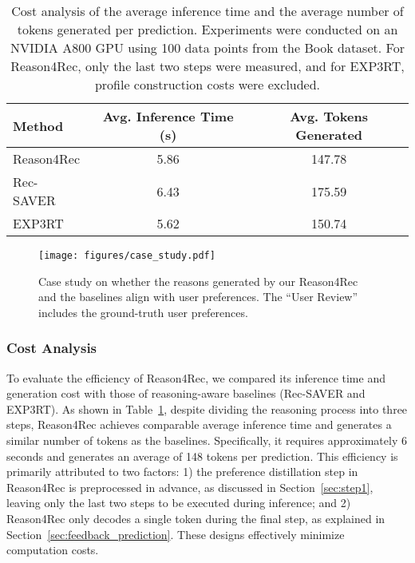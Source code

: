 \begin{table}[b]
\centering
\caption{
Cost analysis of the average inference time and the average number of tokens generated per prediction. Experiments were conducted on an NVIDIA A800 GPU using 100 data points from the Book dataset. For Reason4Rec, only the last two steps were measured, and for EXP3RT, profile construction costs were excluded.
}
\begin{tabular}{lcc}
\toprule
Method & Avg. Inference Time (s) & Avg. Tokens Generated \\ \midrule
Reason4Rec   & 5.86           & 147.78           \\
Rec-SAVER    & 6.43           & 175.59           \\
EXP3RT & 5.62           & 150.74           \\ \bottomrule
\end{tabular}
\label{tab:overhead-analysis}
\end{table}

\begin{figure}[b]
  \centering
\texttt{[image: figures/case\_study.pdf]}
  \caption{Case study on whether the reasons generated by our Reason4Rec and the baselines align with user preferences. The ``User Review''  includes the ground-truth user preferences.}
  \label{fig:case}
\end{figure}

\subsubsection{\textbf{Cost Analysis}}
To evaluate the efficiency of Reason4Rec, we compared its inference time and generation cost with those of reasoning-aware baselines (Rec-SAVER and EXP3RT). As shown in Table~\ref{tab:overhead-analysis}, despite dividing the reasoning process into three steps, Reason4Rec achieves comparable average inference time and generates a similar number of tokens as the baselines. Specifically, it requires approximately 6 seconds and generates an average of 148 tokens per prediction. This efficiency is primarily attributed to two factors: 1) the preference distillation step in Reason4Rec is preprocessed in advance, as discussed in Section~\ref{sec:step1}, leaving only the last two steps to be executed during inference; and 2) Reason4Rec only decodes a single token during the final step, as explained in Section~\ref{sec:feedback_prediction}. These designs effectively minimize computation costs.


